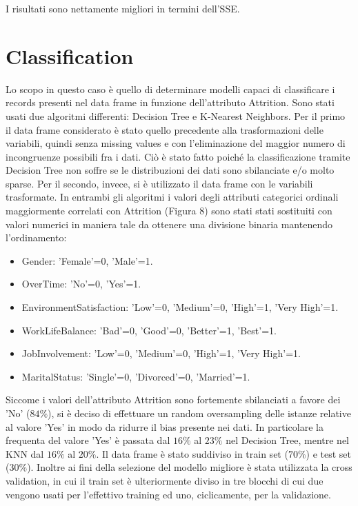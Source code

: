 \documentclass[a4paper,9pt]{article}
\begin{document}
I risultati sono nettamente migliori in termini dell'SSE.

\section{Classification}
Lo scopo in questo caso è quello di determinare modelli capaci di classificare i records presenti nel data frame in funzione dell'attributo Attrition. Sono stati usati due algoritmi differenti: Decision Tree e K-Nearest Neighbors. Per il primo il data frame considerato è stato quello precedente alla trasformazioni delle variabili, quindi senza missing values e con l'eliminazione del maggior numero di incongruenze possibili fra i dati. Ciò è stato fatto poiché la classificazione tramite Decision Tree non soffre se le distribuzioni dei dati sono sbilanciate e/o molto sparse. Per il secondo, invece, si è utilizzato il data frame con le variabili trasformate. 
In entrambi gli algoritmi i valori degli attributi categorici ordinali maggiormente correlati con Attrition (Figura $8$) sono stati stati sostituiti con valori numerici in maniera tale da ottenere una divisione binaria mantenendo l'ordinamento:

\begin{itemize}
\item Gender: 'Female'=0, 'Male'=1.
\item OverTime: 'No'=0, 'Yes'=1.
\item EnvironmentSatisfaction: 'Low'=0, 'Medium'=0, 'High'=1, 'Very High'=1.
\item WorkLifeBalance: 'Bad'=0, 'Good'=0, 'Better'=1, 'Best'=1.
\item JobInvolvement: 'Low'=0, 'Medium'=0, 'High'=1, 'Very High'=1.
\item MaritalStatus: 'Single'=0, 'Divorced'=0, 'Married'=1.
\end{itemize}

Siccome i valori dell'attributo Attrition sono fortemente sbilanciati a favore dei 'No' ($84\%$), si è deciso di effettuare un random oversampling delle istanze relative al valore 'Yes' in modo da ridurre il bias presente nei dati. In particolare la frequenta del valore 'Yes' è passata dal $16\%$ al $23\%$ nel Decision Tree, mentre nel KNN dal $16\%$ al $20\%$.
Il data frame è stato suddiviso in train set ($70\%$) e test set ($30\%$). Inoltre ai fini della selezione del modello migliore è stata utilizzata la cross validation, in cui il train set è ulteriormente diviso in tre blocchi di cui due vengono usati per l'effettivo training ed uno, ciclicamente, per la validazione.
\end{document}
